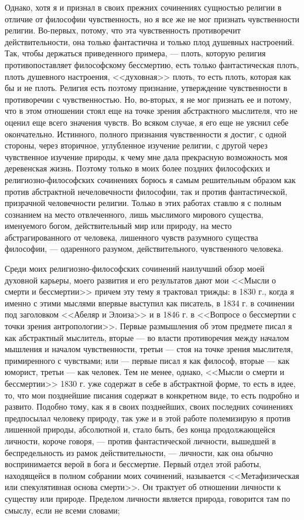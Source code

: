 \documentclass[12pt]{article}
\begin{document}
Однако, хотя я и признал в своих прежних сочинениях сущностью религии в отличие от философии чувственность, но я все же не мог признать чувственности религии. Во-первых, потому, что эта чувственность противоречит действительности, она только фантастична и только плод душевных настроений. Так, чтобы держаться приведенного примера, --- плоть, которую религия противопоставляет философскому бессмертию, есть только фантастическая плоть, плоть душевного настроения, <<духовная>> плоть, то есть плоть, которая как бы и не плоть. Религия есть поэтому признание, утверждение чувственности в противоречии с чувственностью. Но, во-вторых, я не мог признать ее и потому, что в этом отношении стоял еще на точке зрения абстрактного мыслителя, что не оценил еще всего значения чувств. Во всяком случае, я его еще не уяснил себе окончательно. Истинного, полного признания чувственности я достиг, с одной стороны, через вторичное, углубленное изучение религии, с другой через чувственное изучение природы, к чему мне дала прекрасную возможность моя деревенская жизнь. Поэтому только в моих более поздних философских и религиозно-философских сочинениях борюсь я самым решительным образом как против абстрактной нечеловечности философии, так и против фантастической, призрачной человечности религии. Только в этих работах ставлю я с полным сознанием на место отвлеченного, лишь мыслимого мирового существа, именуемого богом, действительный мир или природу, на место абстрагированного от человека, лишенного чувств разумного существа философии, --- одаренного разумом, действительного, чувственного человека. 

Среди моих религиозно-философских сочинений наилучший обзор моей духовной карьеры, моего развития и его результатов дают мои <<Мысли о смерти и бессмертии>>  причем эту тему я трактовал трижды: в 1830 г., когда я именно с этими мыслями впервые выступил как писатель, в 1834 г. в сочинении под заголовком <<Абеляр и Элоиза>> и в 1846 г. в <<Вопросе о бессмертии с точки зрения антропологии>>. Первые размышления об этом предмете писал я как абстрактный мыслитель, вторые --- во власти противоречия между началом мышления и началом чувственности, третьи --- стоя на точке зрения мыслителя, примиренного с чувствами; или --- первые писал я как философ, вторые --- как юморист, третьи --- как человек. Тем не менее, однако, <<Мысли о смерти и бессмертии>> 1830 г. уже содержат в себе в абстрактной форме, то есть в идее, то, что мои позднейшие писания содержат в конкретном виде, то есть подробно и развито. Подобно тому, как я в своих позднейших, своих последних сочинениях предпосылал человеку природу, так уже и в этой работе полемизирую я против лишенной природы, абсолютной и, стало быть, без конца продолжающейся личности, короче говоря, --- против фантастической личности, вышедшей в беспредельность из рамок действительности, --- личности, как она обычно воспринимается верой в бога и бессмертие. Первый отдел этой работы, находящейся в полном собрании моих сочинений, называется <<Метафизическая или спекулятивная основа смерти>>. Он трактует об отношении личности к существу или природе. Пределом личности является природа, говорится там по смыслу, если не всеми словами; 
\end{document}
